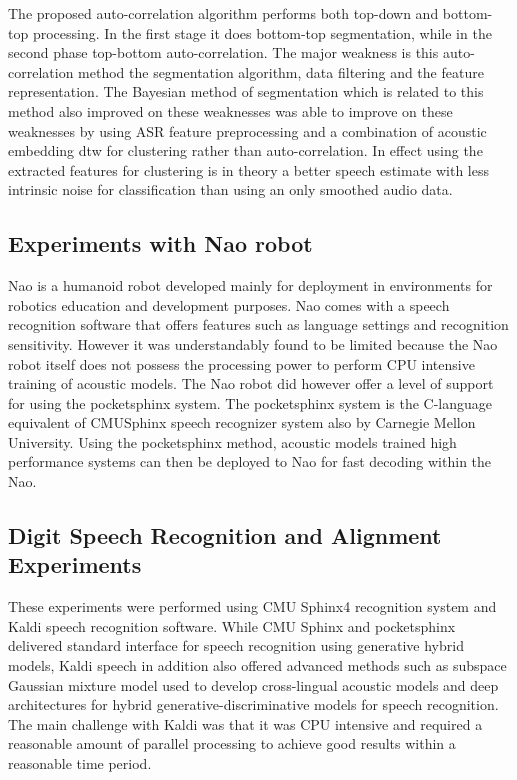 The proposed auto-correlation algorithm performs both top-down and bottom-top processing.  In the first stage it does bottom-top segmentation, while in the second phase top-bottom auto-correlation.   The major weakness is this auto-correlation method the segmentation algorithm, data filtering and the feature representation.  The Bayesian method of segmentation \citep{kamper2016unsupervised} which is related to this method also improved on these weaknesses was able to improve on these weaknesses by using ASR feature preprocessing and a combination of acoustic embedding \acrfull{dtw} for clustering rather than auto-correlation.  In effect using the extracted features for clustering is in theory a better speech estimate with less intrinsic noise for classification than using an only smoothed audio data.

\subsection{Experiments with Nao robot}
Nao is a humanoid robot developed mainly for deployment in environments for robotics education and development purposes.  Nao comes with a speech recognition software that offers features such as language settings and recognition sensitivity.  However it was understandably found to be limited because the Nao robot itself does not possess the processing power to perform CPU intensive training of acoustic models.  The Nao robot did however offer a level of support for using the pocketsphinx system. The pocketsphinx system is the C-language equivalent of CMUSphinx speech recognizer system also by Carnegie Mellon University.  Using the pocketsphinx method, acoustic models trained high performance systems can then be deployed to Nao for fast decoding within the Nao.  

\subsection{Digit Speech Recognition and Alignment Experiments}\label{sec_digitspeech}
These experiments were performed using CMU Sphinx4 recognition system and Kaldi speech recognition software.  While CMU Sphinx and pocketsphinx delivered standard interface for speech recognition using generative hybrid models, Kaldi speech in addition also offered advanced methods such as subspace Gaussian mixture model used to develop cross-lingual acoustic models and deep architectures for hybrid generative-discriminative models for speech recognition.   The main challenge with Kaldi was that it was CPU intensive and required a reasonable amount of parallel processing to achieve good results within a reasonable time period. 


